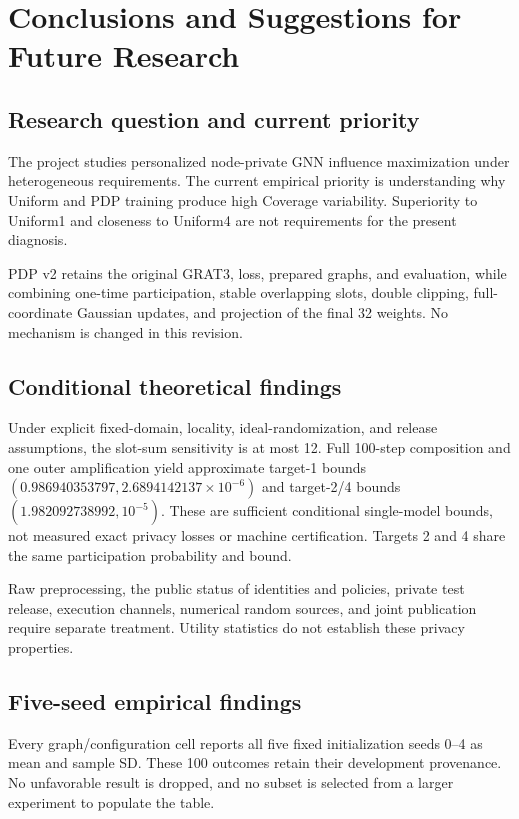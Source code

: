 \chapter{Conclusions and Suggestions for Future Research}\label{ch:conclusion}
\section{Research question and current priority}
The project studies personalized node-private GNN influence maximization under heterogeneous requirements. The current empirical priority is understanding why Uniform and PDP training produce high Coverage variability. Superiority to Uniform1 and closeness to Uniform4 are not requirements for the present diagnosis.

PDP v2 retains the original GRAT3, loss, prepared graphs, and evaluation, while combining one-time participation, stable overlapping slots, double clipping, full-coordinate Gaussian updates, and projection of the final 32 weights. No mechanism is changed in this revision.

\section{Conditional theoretical findings}
Under explicit fixed-domain, locality, ideal-randomization, and release assumptions, the slot-sum sensitivity is at most 12. Full 100-step composition and one outer amplification yield approximate target-1 bounds $(0.986940353797,2.6894142137\times10^{-6})$ and target-2/4 bounds $(1.982092738992,10^{-5})$. These are sufficient conditional single-model bounds, not measured exact privacy losses or machine certification. Targets 2 and 4 share the same participation probability and bound.

Raw preprocessing, the public status of identities and policies, private test release, execution channels, numerical random sources, and joint publication require separate treatment. Utility statistics do not establish these privacy properties.

\section{Five-seed empirical findings}
Every graph/configuration cell reports all five fixed initialization seeds 0--4 as mean and sample SD. These 100 outcomes retain their development provenance. No unfavorable result is dropped, and no subset is selected from a larger experiment to populate the table.

